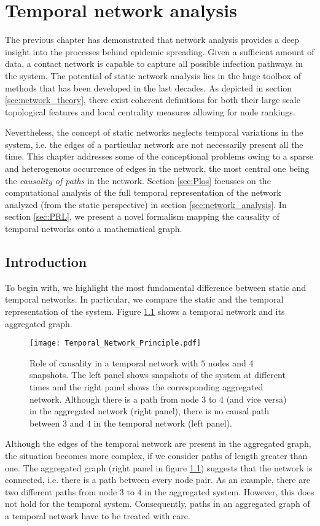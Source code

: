 \chapter{Temporal network analysis}\label{sec:temporal_networks}
The previous chapter has demonstrated that network analysis provides a deep insight into the processes behind epidemic spreading.
Given a sufficient amount of data, a contact network is capable to capture all possible infection pathways in the system.
The potential of static network analysis lies in the huge toolbox of methods that has been developed in the last decades.
As depicted in section \ref{sec:network_theory}, there exist coherent definitions for both their large scale topological features and local centrality measures allowing for node rankings.

Nevertheless, the concept of static networks neglects temporal variations in the system, i.e. the edges of a particular network are not necessarily present all the time.
This chapter addresses some of the conceptional problems owing to a sparse and heterogenous occurrence of edges in the network, the most central one being the \emph{causality of paths} in the network.
Section \ref{sec:Plos} focusses on the computational analysis of the full temporal representation of the network analyzed (from the static perspective) in section \ref{sec:network_analysis}.
In section \ref{sec:PRL}, we present a novel formalism mapping the causality of temporal networks onto a mathematical graph.

\section{Introduction}
To begin with, we highlight the most fundamental difference between static and temporal networks.
In particular, we compare the static and the temporal representation of the system.
Figure \ref{fig:temporal_network_principle} shows a temporal network and its aggregated graph.
%
\begin{figure}[htb]
\begin{center}
\texttt{[image: Temporal\_Network\_Principle.pdf]}
\caption{%
Role of causality in a temporal network with $5$ nodes and $4$ snapshots.
The left panel shows snapshots of the system at different times and the right panel shows the corresponding aggregated network.
Although there is a path from node $3$ to $4$ (and vice versa) in the aggregated network (right panel), there is no causal path between $3$ and $4$ in the temporal network (left panel).
}
\label{fig:temporal_network_principle}
\end{center}
\end{figure}
%
Although the edges of the temporal network are present in the aggregated graph, the situation becomes more complex, if we consider paths of length greater than one.
The aggregated graph (right panel in figure \ref{fig:temporal_network_principle}) suggests that the network is connected, i.e. there is a path between every node pair.
As an example, there are two different paths from node $3$ to $4$ in the aggregated system.
However, this does not hold for the temporal system.
Consequently, paths in an aggregated graph of a temporal network have to be treated with care.

